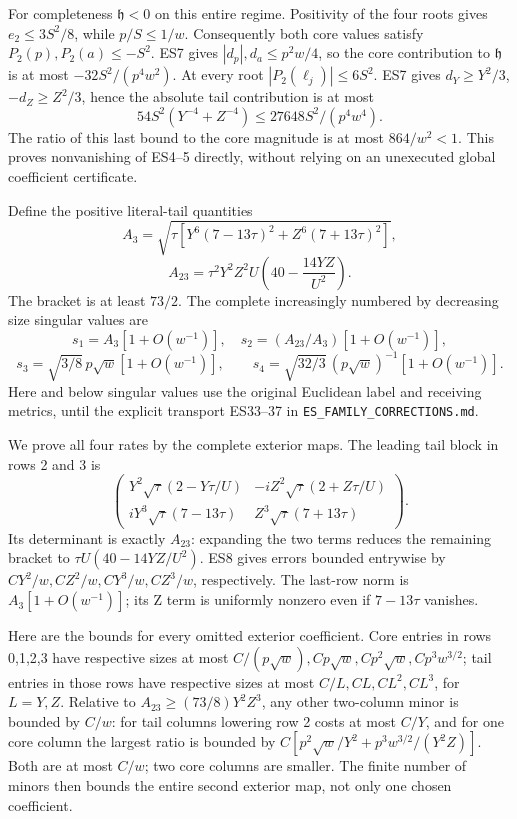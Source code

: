 \documentclass[11pt]{article}
\begin{document}
For completeness \(\mathfrak h<0\) on this entire regime. Positivity of the four roots gives \(e_2\le3S^2/8\), while \(p/S\le1/w\). Consequently both core values satisfy \(P_2(p),P_2(a)\le-S^2\). ES7 gives \(|d_p|,d_a\le p^2w/4\), so the core contribution to \(\mathfrak h\) is at most \(-32S^2/(p^4w^2)\). At every root \(|P_2(\ell_j)|\le6S^2\). ES7 gives \(d_Y\ge Y^2/3\), \(-d_Z\ge Z^2/3\), hence the absolute tail contribution is at most \[
54S^2(Y^{-4}+Z^{-4})\le27648S^2/(p^4w^4).
\] The ratio of this last bound to the core magnitude is at most \(864/w^2<1\). This proves nonvanishing of ES4--5 directly, without relying on an unexecuted global coefficient certificate.

Define the positive literal-tail quantities \[
A_3=\sqrt{\tau[Y^6(7-13\tau)^2+Z^6(7+13\tau)^2]},
\] \[
A_{23}=\tau^2Y^2Z^2U\left(40-\frac{14YZ}{U^2}\right).
\tag{ES9}
\] The bracket is at least \(73/2\). The complete increasingly numbered by decreasing size singular values are \[
s_1=A_3[1+O(w^{-1})],\quad s_2=(A_{23}/A_3)[1+O(w^{-1})],
\] \[
s_3=\sqrt{3/8}\,p\sqrt w[1+O(w^{-1})],\qquad
s_4=\sqrt{32/3}\,(p\sqrt w)^{-1}[1+O(w^{-1})].
\tag{ES10}
\] Here and below singular values use the original Euclidean label and receiving metrics, until the explicit transport ES33--37 in \texttt{ES\_FAMILY\_CORRECTIONS.md}.

We prove all four rates by the complete exterior maps. The leading tail block in rows 2 and 3 is \[
\begin{pmatrix}
Y^2\sqrt\tau(2-Y\tau/U)&-iZ^2\sqrt\tau(2+Z\tau/U)\\
iY^3\sqrt\tau(7-13\tau)&Z^3\sqrt\tau(7+13\tau)
\end{pmatrix}.
\tag{ES11}
\] Its determinant is exactly \(A_{23}\): expanding the two terms reduces the remaining bracket to \(\tau U(40-14YZ/U^2)\). ES8 gives errors bounded entrywise by \(CY^2/w,CZ^2/w,CY^3/w,CZ^3/w\), respectively. The last-row norm is \(A_3[1+O(w^{-1})]\); its Z term is uniformly nonzero even if \(7-13\tau\) vanishes.

Here are the bounds for every omitted exterior coefficient. Core entries in rows 0,1,2,3 have respective sizes at most \(C/(p\sqrt w),Cp\sqrt w,Cp^2\sqrt w,Cp^3w^{3/2}\); tail entries in those rows have respective sizes at most \(C/L,CL,CL^2,CL^3\), for \(L=Y,Z\). Relative to \(A_{23}\ge(73/8)Y^2Z^3\), any other two-column minor is bounded by \(C/w\): for tail columns lowering row 2 costs at most \(C/Y\), and for one core column the largest ratio is bounded by \(C[p^2\sqrt w/Y^2+p^3w^{3/2}/(Y^2Z)]\). Both are at most \(C/w\); two core columns are smaller. The finite number of minors then bounds the entire second exterior map, not only one chosen coefficient.
\end{document}
